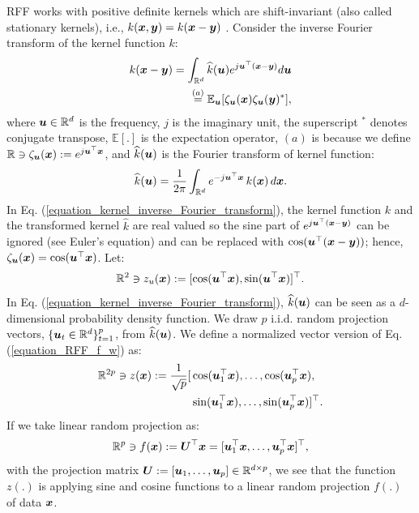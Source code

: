 \documentclass{article}
\def\b{\ensuremath\boldsymbol}
\begin{document}
RFF works with positive definite kernels which are shift-invariant (also called stationary kernels), i.e., $k(\b{x}, \b{y}) = k(\b{x} - \b{y})$ \cite{ghojogh2021reproducing}.
Consider the inverse Fourier transform of the kernel function $k$:
\begin{equation}\label{equation_kernel_inverse_Fourier_transform}
\begin{aligned}
k(\b{x} - \b{y}) = \int_{\mathbb{R}^d} \widehat{k}(\b{u}) e^{j \b{u}^\top (\b{x} - \b{y})} d\b{u} \\
\overset{(a)}{=} \mathbb{E}_{\b{u}}[\zeta_{\b{u}}(\b{x}) \zeta_{\b{u}}(\b{y})^*],
\end{aligned}
\end{equation}
where $\b{u} \in \mathbb{R}^d$ is the frequency, $j$ is the imaginary unit, the superscript $^*$ denotes conjugate transpose, $\mathbb{E}[.]$ is the expectation operator, $(a)$ is because we define $\mathbb{R} \ni \zeta_{\b{u}}(\b{x}) := e^{j \b{u}^\top \b{x}}$, and $\widehat{k}(\b{u})$ is the Fourier transform of kernel function:
\begin{align}\label{equation_kernel_Fourier_transform}
\widehat{k}(\b{u}) = \frac{1}{2\pi} \int_{\mathbb{R}^d} e^{-j \b{u}^\top \b{x}}\, k(\b{x})\, d\b{x}. 
\end{align}
In Eq. (\ref{equation_kernel_inverse_Fourier_transform}), the kernel function $k$ and the transformed kernel $\widehat{k}$ are real valued so the sine part of $e^{j \b{u}^\top (\b{x} - \b{y})}$ can be ignored (see Euler's equation) and can be replaced with $\cos(\b{u}^\top (\b{x} - \b{y}))$; hence, $\zeta_{\b{u}}(\b{x}) = \cos(\b{u}^\top \b{x})$. Let:
\begin{align}\label{equation_RFF_f_w}
\mathbb{R}^2 \ni z_u(\b{x}) := [\cos(\b{u}^\top \b{x}), \sin(\b{u}^\top \b{x})]^\top.
\end{align}
In Eq. (\ref{equation_kernel_inverse_Fourier_transform}), $\widehat{k}(\b{u})$ can be seen as a $d$-dimensional probability density function. 
We draw $p$ i.i.d. random projection vectors, $\{\b{u}_t \in \mathbb{R}^d\}_{t=1}^p$, from $\widehat{k}(\b{u})$. 
We define a normalized vector version of Eq. (\ref{equation_RFF_f_w}) as:
\begin{equation}\label{equation_RFF_z_vector}
\begin{aligned}
\mathbb{R}^{2p} \ni z(\b{x}) := \frac{1}{\sqrt{p}} [&\cos(\b{u}_1^\top \b{x}), \dots, \cos(\b{u}_p^\top \b{x}), \\
&\sin(\b{u}_1^\top \b{x}), \dots, \sin(\b{u}_p^\top \b{x})]^\top.
\end{aligned}
\end{equation}
If we take linear random projection as:
\begin{align}
\mathbb{R}^{p} \ni f(\b{x}) := \b{U}^\top \b{x} = [\b{u}_1^\top \b{x}, \dots, \b{u}_p^\top \b{x}]^\top,
\end{align}
with the projection matrix $\b{U} := [\b{u}_1, \dots, \b{u}_p] \in \mathbb{R}^{d \times p}$, we see that the function $z(.)$ is applying sine and cosine functions to a linear random projection $f(.)$ of data $\b{x}$.
\end{document}
